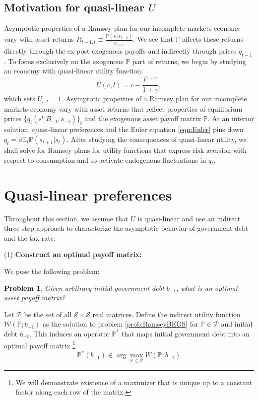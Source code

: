 \documentclass[12pt]{article}
\newtheorem{problem}[theorem]{Problem}
\begin{document}
\subsection{Motivation for  quasi-linear $U$\label{sec:excusequasilinear}}
Asymptotic properties of a Ramsey plan for our incomplete markets economy vary  with asset returns $R_{t-1,t}\equiv \frac{\mathbb{P}(s_{t}|s_{t-1})}{q_{t-1}}$. We see that $\mathbb{P}$ affects these returns directly through the ex-post exogenous payoffs and indirectly through prices $q_{t-1}$. To focus exclusively on the exogenous $\mathbb{P}$ part of returns, we begin  by studying an economy with  quasi-linear  utility function:
  \begin{equation}\label{eqn:UQL}
U(c,l)=c-\frac{l^{1+\gamma}}{1+\gamma},\end{equation} which sets $U_{c,t}= 1$.  Asymptotic properties of a Ramsey plan for our incomplete markets economy vary  with   asset returns that reflect
	properties of equilibrium prices $\{q_t(s^t|B_{-1},s_{-1})\}_t$ and the exogenous asset payoff matrix $\mathbb{P}$.
At an interior solution, quasi-linear preferences and the Euler equation \eqref{eqn:Euler} pins down $q_t=\beta \mathbb{E}_t
\mathbb{P}(s_{t+1}|s_t)$.  After studying the consequences of quasi-linear utility, we shall solve for Ramsey plans for utility functions that express risk aversion with respect to consumption and so activate endogenous fluctuations in $q_t$.
	


\section{Quasi-linear preferences}

Throughout this section, we assume that $U$ is quasi-linear and use an indirect three step approach to  characterize  the asymptotic behavior of government  debt and the tax rate.



\noindent (1) \textbf{Construct  an optimal payoff matrix:}

We pose the following problem:
\begin{problem}\label{prob:PPoperator}
 Given arbitrary initial government debt $b_{-1}$, what is an optimal asset payoff matrix?
\end{problem}
\noindent  Let $\mathcal P$ be the set of all $\mathcal S\times \mathcal S$ real matrices.  Define the indirect utility function $\mathcal W(\mathbb P;b_{-1})$ as the solution to problem \ref{prob:RamseyBEGS} for $\mathbb P \in \mathcal P$ and initial debt $b_{-1}$.  This induces an operator $\mathbb P^*$ that maps initial government debt into an optimal payoff matrix \footnote{We will demonstrate existence of a maximizer that is unique up to a constant factor along each row of the matrix.}
\[
	\mathbb P^*(b_{-1}) \in \arg\max_{\mathbb P\in \mathcal P} W(\mathbb P; b_{-1})
\]
\end{document}
